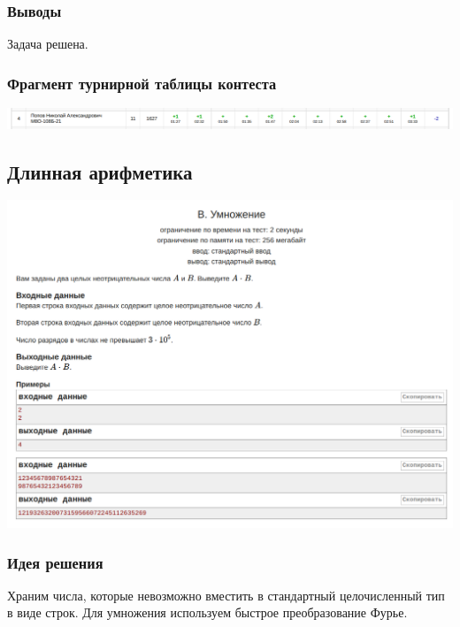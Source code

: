 \subsubsection*{Выводы}
Задача решена.
\newline

\subsubsection*{Фрагмент турнирной таблицы контеста}
\begin{center}
\includegraphics[width=\textwidth]{standings/Contest1Result.png}\newline\noindent
\end{center}


\subsection*{Длинная арифметика}

\begin{center}
\includegraphics[width=\textwidth]{statements/Contest6B.png}
\end{center}

\subsubsection*{Идея решения}

Храним числа, которые невозможно вместить в стандартный 
целочисленный тип в виде строк. Для умножения используем быстрое 
преобразование Фурье. \newline


